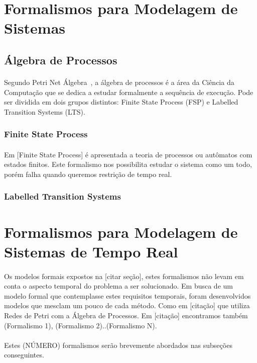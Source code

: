 \section{Formalismos para Modelagem de Sistemas}

\subsection{Álgebra de Processos}
\paragraph{}
Segundo Petri Net Álgebra~\cite{books/daglib/0003970}, a álgebra de processos é a área da Ciência da Computação que se dedica
a estudar formalmente a sequência de execução. Pode ser dividida em dois
grupos distintos: Finite State Process (FSP) e Labelled Transition Systems (LTS).

\subsubsection{Finite State Process}
\paragraph{}
Em [Finite State Process] é apresentada a teoria de processos ou autômatos com estados finitos.
Este formalismo nos possibilita estudar o sistema como um todo, porém falha quando queremos restrição de tempo real.
\subsubsection{Labelled Transition Systems}


\section{Formalismos para Modelagem de Sistemas de Tempo Real}
\paragraph{}
Os modelos formais expostos na [citar seção], estes formalismos não levam em conta o aspecto temporal do problema
a ser solucionado.
Em busca de um modelo formal que contemplasse estes requisitos temporais, foram desenvolvidos modelos que mesclam
um pouco de cada método. Como em [citação] que utiliza Redes de Petri com a Álgebra de Processos. Em [citação]
encontramos também (Formalismo 1), (Formalismo 2)..(Formalismo N).
\paragraph{}
Estes (NÚMERO) formalismos serão brevemente abordados nas subseções conseguintes.


